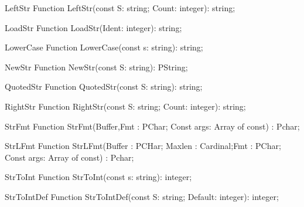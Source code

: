  
\begin{function}{LeftStr}
\Declaration
Function LeftStr(const S: string; Count: integer): string;
\Description
\Errors
\SeeAlso
\end{function}

 
\begin{function}{LoadStr}
\Declaration
Function LoadStr(Ident: integer): string;
\Description
\Errors
\SeeAlso
\end{function}

 
\begin{function}{LowerCase}
\Declaration
Function LowerCase(const s: string): string;
\Description
\Errors
\SeeAlso
\end{function}

 
\begin{function}{NewStr}
\Declaration
Function NewStr(const S: string): PString;
\Description
\Errors
\SeeAlso
\end{function}

 
\begin{function}{QuotedStr}
\Declaration
Function QuotedStr(const S: string): string;
\Description
\Errors
\SeeAlso
\end{function}

 
\begin{function}{RightStr}
\Declaration
Function RightStr(const S: string; Count: integer): string;
\Description
\Errors
\SeeAlso
\end{function}

 
\begin{function}{StrFmt}
\Declaration
Function StrFmt(Buffer,Fmt : PChar; Const args: Array of const) : Pchar;
\Description
\Errors
\SeeAlso
\end{function}

 
\begin{function}{StrLFmt}
\Declaration
Function StrLFmt(Buffer : PCHar; Maxlen : Cardinal;Fmt : PChar; Const args: Array of const) : Pchar;
\Description
\Errors
\SeeAlso
\end{function}

 
\begin{function}{StrToInt}
\Declaration
Function StrToInt(const s: string): integer;
\Description
\Errors
\SeeAlso
\end{function}

 
\begin{function}{StrToIntDef}
\Declaration
Function StrToIntDef(const S: string; Default: integer): integer;
\Description
\Errors
\SeeAlso
\end{function}

